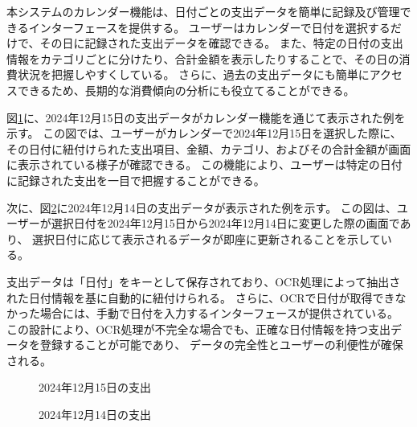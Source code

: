 \documentclass[main]{subfiles}
\begin{document}
本システムのカレンダー機能は、日付ごとの支出データを簡単に記録及び管理できるインターフェースを提供する。
ユーザーはカレンダーで日付を選択するだけで、その日に記録された支出データを確認できる。
また、特定の日付の支出情報をカテゴリごとに分けたり、合計金額を表示したりすることで、その日の消費状況を把握しやすくしている。
さらに、過去の支出データにも簡単にアクセスできるため、長期的な消費傾向の分析にも役立てることができる。

図\ref{fig:12-15}に、2024年12月15日の支出データがカレンダー機能を通じて表示された例を示す。
この図では、ユーザーがカレンダーで2024年12月15日を選択した際に、
その日付に紐付けられた支出項目、金額、カテゴリ、およびその合計金額が画面に表示されている様子が確認できる。
この機能により、ユーザーは特定の日付に記録された支出を一目で把握することができる。

次に、図\ref{fig:12-14}に2024年12月14日の支出データが表示された例を示す。
この図は、ユーザーが選択日付を2024年12月15日から2024年12月14日に変更した際の画面であり、
選択日付に応じて表示されるデータが即座に更新されることを示している。

支出データは「日付」をキーとして保存されており、OCR処理によって抽出された日付情報を基に自動的に紐付けられる。
さらに、OCRで日付が取得できなかった場合には、手動で日付を入力するインターフェースが提供されている。
この設計により、OCR処理が不完全な場合でも、正確な日付情報を持つ支出データを登録することが可能であり、
データの完全性とユーザーの利便性が確保される。

\begin{figure}[tb]
    \begin{center}
        \caption{2024年12月15日の支出}
        \label{fig:12-15}
    \end{center}
\end{figure}

\begin{figure}[tb]
    \begin{center}
        \caption{2024年12月14日の支出}
        \label{fig:12-14}
    \end{center}
\end{figure}
\end{document}
